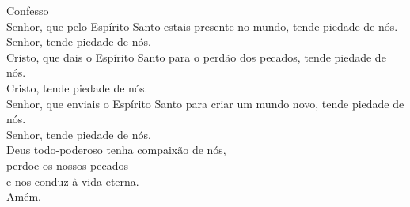 \textcolor{VioletRed1}{Confesso}
\vspace{0.2cm} \\
\VbarRed{} Senhor, que pelo Espírito Santo estais presente no mundo, tende piedade de nós.\\
\RbarRed{} Senhor, tende piedade de nós.
\vspace{0.1cm} \\
\VbarRed{} Cristo, que dais o Espírito Santo para o perdão dos pecados, tende piedade de nós.\\
\RbarRed{} Cristo, tende piedade de nós.
\vspace{0.1cm} \\
\VbarRed{} Senhor, que enviais o Espírito Santo para criar um mundo novo, tende piedade de nós.\\
\RbarRed{} Senhor, tende piedade de nós.
\vspace{0.1cm} \\
Deus todo-poderoso tenha compaixão de nós, \\
perdoe os nossos pecados \\
e nos conduz à vida eterna. \\
\RbarRed{} Amém.
\vspace{0.2cm} \\
